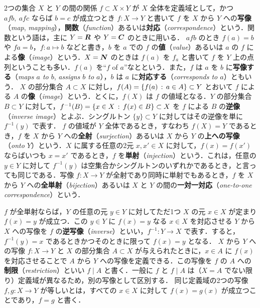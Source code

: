 \documentclass[pandoc,base=10pt,b5j,precisetext]{bxjsarticle}
\begin{document}
2つの集合 \(X\) と \(Y\) の間の関係 \(f \subset X \times Y\) が \(X\)
全体を定義域として，かつ \(afb,\ afc\) ならば \(b = c\) が成立つとき
\(f \colon X \to Y\) と書いて \(f\) を \(X\) から \(Y\)
への\textbf{写像}（\emph{map},
\emph{mapping}），\textbf{関数}（\emph{function}）あるいは\textbf{対応}（\emph{correspondence}）という．関数という語は，主に
\(Y = \boldsymbol{R}\) や \(Y = \boldsymbol{C}\) のときに用いる． \(afb\) のとき
\(f(a) = b\) や \(fa = b\)，\(f \colon a \mapsto b\) などと書き，\(b\)
を \(a\) での \(f\) の\textbf{値}（\emph{value}）あるいは \(a\) の \(f\)
による\textbf{像}（\emph{image}）という．\(X = \boldsymbol{N}\) のときは \(f(a)\)
を \(f_a\) と書いて \(f\) を \(Y\) 上の点列ということも多い．\(f(a)\)
を``\(f\) of \(a\)''なとという．また，\(f\) は \(a\) を \(b\)
に\textbf{写像する}（\emph{maps \(a\) to \(b\)}, \emph{assigns \(b\) to
\(a\)}），\(b\) は \(a\) に\textbf{対応する}（\emph{corresponds to
\(a\)}）ともいう． \(X\) の部分集合 \(A \subset X\)
に対し，\(f(A) = \{ f(a) \,:\, a \in A \} \subset Y\) とおいて \(f\)
による \(A\) の\textbf{像}（\emph{image}）という．とくに，\(f(X)\) は
\(f\) の値域となる．\(Y\) の部分集合 \(B \subset Y\)
に対して，\(f^{-1}(B) = \{ x \in X \,:\, f(x) \in B \} \subset X\) を
\(f\) による \(B\) の\textbf{逆像}（\emph{inverse
image}）とよぶ．シングルトン \(\{ y \} \subset Y\)
に対してはその逆像を単に \(f^{-1}(y)\) で表す． \(f\) の値域が \(Y\)
全体であるとき，すなわち \(f(X) = Y\) であるとき，\(f\) を \(X\) から
\(Y\) への\textbf{全射}（\emph{surjection}）あるいは \(X\) から \(Y\)
の\textbf{上への写像}（\emph{onto \(Y\)}）という．\(X\)
に属する任意の2元 \(x, x' \in X\) に対して，\(f(x) = f(x')\)
ならばいつも \(x = x'\) であるとき，\(f\)
を\textbf{単射}（\emph{injection}）という．これは，任意の \(y \in Y\)
に対して \(f^{-1}(y)\)
は空集合かシングルトンのいずれかであるとき，と言っても同じである．写像
\(f \colon X \to Y\) が全射であり同時に単射でもあるとき，\(f\) を \(X\)
から \(Y\) への\textbf{全単射}（\emph{bijection}）あるいは \(X\) と
\(Y\) の間の\textbf{一対一対応}（\emph{one-to-one
correspondence}）という．

\(f\) が全単射ならば，\(Y\) の任意の元 \(y \in Y\) に対してただ1つ \(X\)
の元 \(x \in X\) が定まり \(f(x) = y\) が成立つ．この \(y \in Y\) に
\(f(x) = y\) なる \(x \in X\) を対応させる \(Y\) から \(X\) への写像を
\(f\)
の\textbf{逆写像}（\emph{inverse}）といい，\(f^{-1} \colon Y \to X\)
で表す．すると，\(f^{-1}(y) = x\) であるときかつそのときに限って
\(f(x) = y\) となる． \(X\) から \(Y\) への写像 \(f \colon X \to Y\) と
\(X\) の部分集合 \(A \subset X\) が与えられたときに，\(x \in A\) に
\(f(x)\) を対応させることで \(A\) から \(Y\)
への写像を定義できる．この写像を \(f\) の \(A\)
への\textbf{制限}（\emph{restriction}）といい \(f \mid A\)
と書く．一般に \(f\) と \(f \mid A\) は（\(X = A\)
でない限り）定義域が異なるため，別の写像として区別する．
同じ定義域の2つの写像 \(f, g \colon X \to Y\) が等しいとは，すべての
\(x \in X\) に対して \(f(x) = g(x)\) が成立つことであり，\(f = g\)
と書く．
\end{document}

